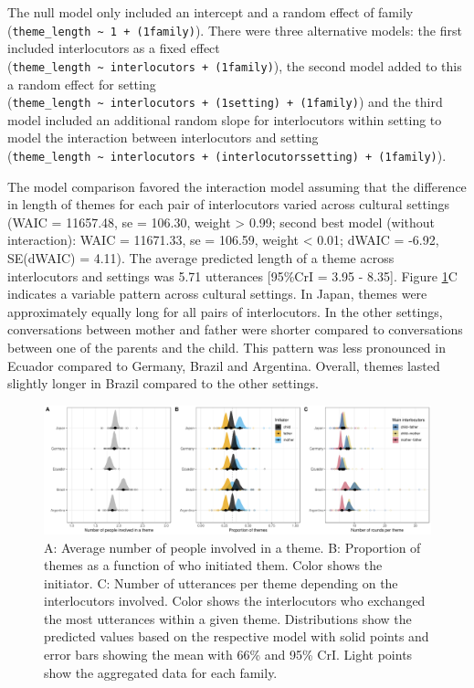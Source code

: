 \documentclass[
  man,floatsintext]{apa6}
\begin{document}
The null model only included an intercept and a random effect of family (\texttt{theme\_length\ \textasciitilde{}\ 1\ +\ (1\textbar{}family)}). There were three alternative models: the first included interlocutors as a fixed effect (\texttt{theme\_length\ \textasciitilde{}\ interlocutors\ +\ (1\textbar{}family)}), the second model added to this a random effect for setting (\texttt{theme\_length\ \textasciitilde{}\ interlocutors\ +\ (1\textbar{}setting)\ +\ (1\textbar{}family)}) and the third model included an additional random slope for interlocutors within setting to model the interaction between interlocutors and setting (\texttt{theme\_length\ \textasciitilde{}\ interlocutors\ +\ (interlocutors\textbar{}setting)\ +\ (1\textbar{}family)}).

The model comparison favored the interaction model assuming that the difference in length of themes for each pair of interlocutors varied across cultural settings (WAIC = 11657.48, se = 106.30, weight \textgreater{} 0.99; second best model (without interaction): WAIC = 11671.33, se = 106.59, weight \textless{} 0.01; dWAIC = -6.92, SE(dWAIC) = 4.11). The average predicted length of a theme across interlocutors and settings was 5.71 utterances {[}95\%CrI = 3.95 - 8.35{]}. Figure \ref{fig:fig3}C indicates a variable pattern across cultural settings. In Japan, themes were approximately equally long for all pairs of interlocutors. In the other settings, conversations between mother and father were shorter compared to conversations between one of the parents and the child. This pattern was less pronounced in Ecuador compared to Germany, Brazil and Argentina. Overall, themes lasted slightly longer in Brazil compared to the other settings.

\begin{figure}
\includegraphics[width=1\linewidth]{../visuals/fig3} \caption{A: Average number of people involved in a theme. B: Proportion of themes as a function of who initiated them. Color shows the initiator. C: Number of utterances per theme depending on the interlocutors involved. Color shows the interlocutors who exchanged the most utterances within a given theme. Distributions show the predicted values based on the respective model with solid points and error bars showing the mean with 66\% and 95\% CrI. Light points show the aggregated data for each family.}\label{fig:fig3}
\end{figure}
\end{document}
